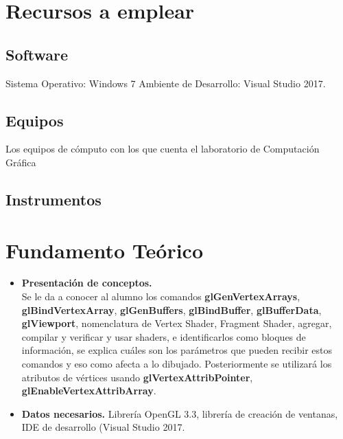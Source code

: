 \documentclass[11pt, english]{article}
\begin{document}
\section{Recursos a emplear}
\subsection{Software}
Sistema Operativo: Windows 7
Ambiente de Desarrollo: Visual Studio 2017.
\subsection{Equipos}
Los equipos de cómputo con los que cuenta el laboratorio de Computación Gráfica
\subsection{Instrumentos}
\section{Fundamento Teórico}
\begin{itemize}
\item \textbf{Presentación de conceptos.} \\
Se le da a conocer al alumno los comandos \textbf{glGenVertexArrays}, \textbf{glBindVertexArray},
\textbf{glGenBuffers}, \textbf{glBindBuffer}, \textbf{glBufferData}, \textbf{glViewport}, nomenclatura de Vertex Shader,
Fragment Shader, agregar, compilar y verificar y usar shaders, e identificarlos como bloques
de información, se explica cuáles son los parámetros que pueden recibir estos comandos y
eso como afecta a lo dibujado. Posteriormente se utilizará los atributos de vértices usando
\textbf{glVertexAttribPointer}, \textbf{glEnableVertexAttribArray}.
\item \textbf{Datos necesarios.}
Librería OpenGL 3.3, librería de creación de ventanas, IDE de desarrollo (Visual Studio 2017.
\end{itemize}
\end{document}
